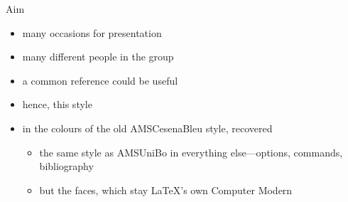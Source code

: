 \begin{frame}[c]{Aim}
%
\begin{itemize}
	\item many occasions for presentation
	\item many different people in the group
	\item a common reference could be useful
	\item hence, this style
	\item in the colours of the old \alert{AMSCesenaBleu} style, recovered
	\begin{itemize}
		\item the same style as \alert{AMSUniBo} in everything else---options, commands, bibliography
		\item but the faces, which stay \LaTeX{}'s own Computer Modern
	\end{itemize}
\end{itemize}
%
\end{frame}
